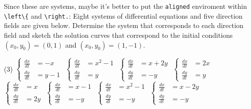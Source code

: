 \documentclass{book}
\begin{document}
    \begin{Exercise}\label{EX22}
        Since these are systems, maybe it's better to put the \verb|aligned| enviroment within  \verb|\left\{| and \verb|\right.|: 
        \Question Eight systems of differential equations and five direction fields are given below.  Determine the system that corresponds to each direction field and sketch the solution curves that correspond to the initial conditions $(x_0, y_0) = (0,1)$ and $(x_0, y_0) = (1,-1)$.
        \begin{tasks}(3)
            \task $\left\{\begin{aligned}
            \frac{dx}{dt} & = -x \\     
            \frac{dy}{dt} & = y-1
            \end{aligned}\right.$
            \task $\left\{\begin{aligned}
            \frac{dx}{dt} & = x^2 - 1 \\        
            \frac{dy}{dt} & = y
            \end{aligned}\right.$
            \task $\left\{\begin{aligned}
            \frac{dx}{dt} & = x+2y \\
            \frac{dy}{dt} & = -y
            \end{aligned}\right.$
            \task $\left\{\begin{aligned}
            \frac{dx}{dt} & = 2x \\
            \frac{dy}{dt} & =  y
            \end{aligned}\right.$
            \task $\left\{\begin{aligned}
            \frac{dx}{dt} & = x \\
            \frac{dy}{dt}  & = 2y
            \end{aligned}\right.$ 
            \task$\left\{\begin{aligned}
            \frac{dx}{dt} & = x-1 \\
            \frac{dy}{dt} & = -y
            \end{aligned}\right.$
            \task $\left\{\begin{aligned}
            \frac{dx}{dt} & = x^2-1 \\
            \frac{dy}{dt} & = -y
            \end{aligned}\right.$        
            \task $\left\{\begin{aligned}
            \frac{dx}{dt} & = x- 2y \\
            \frac{dy}{dt} & =  -y
            \end{aligned}\right.$
        \end{tasks}
    \end{Exercise}
\end{document}
